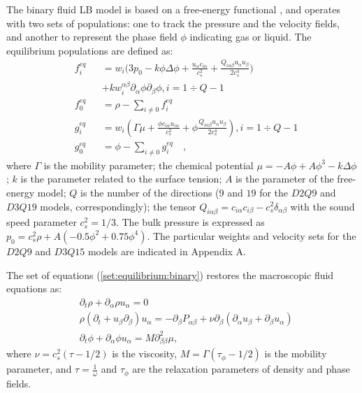\documentclass{CFD2011}
\begin{document}
The binary fluid LB model is
based on a free-energy functional \cite{swift,landau}, and operates with two
sets of populations: one to track the pressure and the velocity fields, and another to represent the
phase field $\phi$ indicating gas or liquid.
The equilibrium populations \cite{pooley-contact} are defined as:
\begin{equation}
\label{set:equilibrium:binary}
\begin{aligned}
&f_i^{eq}&&=w_i 
\biggl(3
p_0 - k \phi \Delta \phi
+\frac{u_{\alpha}c_{i\alpha}}{c_s^2}+\frac{Q_{i\alpha\beta}u_{\alpha } u_ {
\beta}}{2 c_s^4}\biggr)\\
&&&+k w_i^{\alpha\beta} \partial_{\alpha} \phi\partial_{\beta} \phi, i=1\div Q-1\\
&f_0^{eq}&&=\rho-\sum_{i\neq0}{f_i^{eq}}\\
&g_i^{eq}&&=w_i\left(\Gamma \mu + \frac{\phi c_{i\alpha} u_{i\alpha}}{c_s^2}+\phi
\frac{Q_{i\alpha\beta}u_{\alpha}u_{\beta}}{2 c_s^4}\right), i=1\div Q-1\\
&g_0^{eq}&&=\phi-\sum_{i\neq0}{g_i^{eq}}\quad,
\end{aligned}
\end{equation}
where $\Gamma$ is the mobility parameter; the chemical potential
$\mu=-A\phi+A\phi^3-k\Delta\phi$; $k$ is the parameter related to the surface
tension; $A$ is the parameter of the free-energy model; $Q$ is the number of the directions ($9$ and
$19$ for the $D2Q9$ and $D3Q19$ models, correspondingly); the tensor
$Q_{i\alpha\beta}=c_{i\alpha} c_{i\beta} - c_s^2 \delta_{\alpha\beta}$ with
the sound speed parameter $c_s^2=1/3$. The bulk pressure
is expressed as $p_0=c_s^2 \rho +A (-0.5 \phi^2+0.75 \phi^4)$. The particular weights and velocity
sets for the $D2Q9$ and $D3Q15$ models are indicated in Appendix A. 

The set of equations (\ref{set:equilibrium:binary}) restores the macroscopic
fluid equations as:
\begin{equation}
\begin{aligned}
&\partial_t \rho+ \partial_{\alpha} \rho u_{\alpha}=0\\
&\rho\left(\partial_t+u_{\beta}\partial_{\beta}\right) u_{\alpha}=
-\partial_{\beta}P_{\alpha \beta} +
\nu\partial_{\beta}\left(\partial_{\alpha}u_{\beta}+\partial_{\beta} u_{\alpha}\right)\\
&\partial_t \phi + \partial_{\alpha} \phi u_{\alpha}=M \partial^2_{\beta\beta} \mu,
\end{aligned}
\label{binary:fluid:system}
\end{equation}
where $\nu=c_s^2 (\tau-1/2)$ is the viscosity,
$M=\Gamma(\tau_{\phi}-1/2)$ is the mobility parameter, and $\tau=\frac{1}{\omega}$ and $\tau_{\phi}$
are the relaxation parameters of density and phase fields. 
\end{document}
